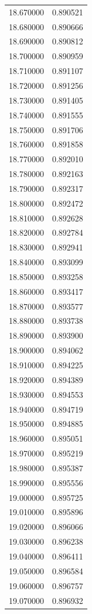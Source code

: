 \begin{tabular}{rr}
18.670000 & 0.890521 \\
18.680000 & 0.890666 \\
18.690000 & 0.890812 \\
18.700000 & 0.890959 \\
18.710000 & 0.891107 \\
18.720000 & 0.891256 \\
18.730000 & 0.891405 \\
18.740000 & 0.891555 \\
18.750000 & 0.891706 \\
18.760000 & 0.891858 \\
18.770000 & 0.892010 \\
18.780000 & 0.892163 \\
18.790000 & 0.892317 \\
18.800000 & 0.892472 \\
18.810000 & 0.892628 \\
18.820000 & 0.892784 \\
18.830000 & 0.892941 \\
18.840000 & 0.893099 \\
18.850000 & 0.893258 \\
18.860000 & 0.893417 \\
18.870000 & 0.893577 \\
18.880000 & 0.893738 \\
18.890000 & 0.893900 \\
18.900000 & 0.894062 \\
18.910000 & 0.894225 \\
18.920000 & 0.894389 \\
18.930000 & 0.894553 \\
18.940000 & 0.894719 \\
18.950000 & 0.894885 \\
18.960000 & 0.895051 \\
18.970000 & 0.895219 \\
18.980000 & 0.895387 \\
18.990000 & 0.895556 \\
19.000000 & 0.895725 \\
19.010000 & 0.895896 \\
19.020000 & 0.896066 \\
19.030000 & 0.896238 \\
19.040000 & 0.896411 \\
19.050000 & 0.896584 \\
19.060000 & 0.896757 \\
19.070000 & 0.896932 \\

\end{tabular}
